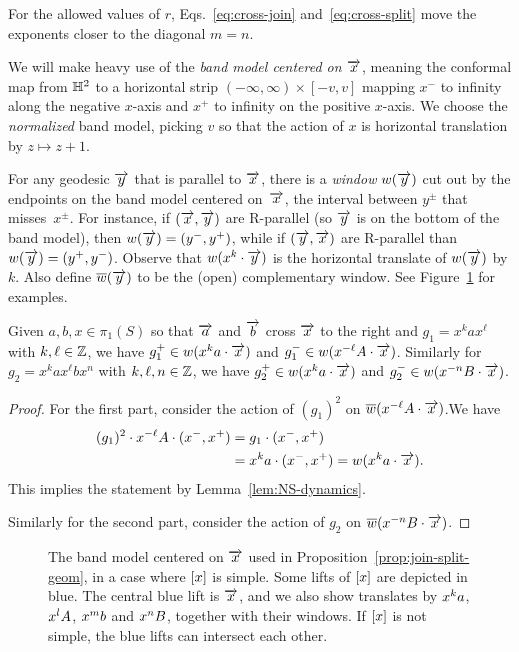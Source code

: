 For the allowed values of $r$, Eqs.\ \eqref{eq:cross-join}
and~\eqref{eq:cross-split} move the exponents closer to the
diagonal
$m=n$.

We will make heavy use of the \emph{band model centered on
$\overrightarrow{x}$}, meaning the conformal map from $\mathbb{H}^2$ to a horizontal
strip $(-\infty,\infty) \times [-v,v]$ mapping $x^-$ to infinity along
the negative $x$-axis and $x^+$ to infinity on the positive $x$-axis.
We choose the \emph{normalized} band model, picking $v$ so that the
action of $x$ is horizontal translation by $z \mapsto z+1$.

For any geodesic $\overrightarrow{y}$ that is parallel to
$\overrightarrow{x}$, there is a \emph{window} $w(\overrightarrow{y})$ cut out by the
endpoints on the band model centered on~$\overrightarrow{x}$, the interval between $y^\pm$ that
misses~$x^\pm$. For instance, if $(\overrightarrow{x},\overrightarrow{y})$ are R-parallel
(so $\overrightarrow{y}$ is on the bottom of the band model),
then $w(\overrightarrow{y}) = (y^-,y^+)$, while if $(\overrightarrow{y},\overrightarrow{x})$ are R-parallel than
$w(\overrightarrow{y}) = (y^+,y^-)$.
Observe that $w(x^k\cdot\overrightarrow{y})$ is the horizontal
translate of $w(\overrightarrow{y})$ by $k$.
Also define $\overline{w}(\overrightarrow{y})$ to be the (open)
complementary window.
See Figure~\ref{fig:abcrossings} for
examples.

\begin{lemma}
\label{lem:windows}
  Given $a,b, x \in \pi_1(S)$ so that $\overrightarrow{a}$ and $\overrightarrow{b}$ cross $\overrightarrow{x}$ to
  the right and $g_1 = x^k ax^\ell$ with $k,\ell \in \mathbb{Z}$, we have
  $g_1^+ \in w(x^k a\cdot\overrightarrow{x})$ and
  $g_1^- \in w(x^{-\ell}A\cdot\overrightarrow{x})$. Similarly for
  $g_2 = x^k a x^\ell b x^n$ with $k,\ell,n\in\mathbb{Z}$, we have
  $g_2^+ \in w(x^ka \cdot \overrightarrow{x})$ and $g_2^- \in w(x^{-n} B
  \cdot\overrightarrow{x})$.
\end{lemma}

\begin{proof}
  For the first part, consider the action of $(g_1)^2$ on
  $\overline{w}(x^{-\ell}A \cdot \overrightarrow{x})$.We have
  \begin{align*}
    (g_1)^2 \cdot x^{-\ell}A \cdot (x^-, x^+)
      &= g_1 \cdot (x^-,x^+)\\
      &= x^k a \cdot (x^-,x^+) = w(x^k a \cdot \overrightarrow{x}).
  \end{align*}
  This implies the statement by Lemma~\ref{lem:NS-dynamics}.

  Similarly for the second part, consider the action of $g_2$
  on $\overline{w}(x^{-n} B \cdot \overrightarrow{x})$.
\end{proof}

\begin{figure}
\caption{The band model centered on $\protect\overrightarrow{x}$ used in
  Proposition~\ref{prop:join-split-geom}, in a case where $\protect [x]$ is simple.
  Some lifts of $\protect [x]$ are depicted in blue. The central blue lift
  is $\protect\overrightarrow{x}$, and we also show translates by $ \protect x^k a$, $\protect x^l
  A$, $\protect x^m b$ and $\protect x^n B$, together with their windows.
  If $\protect[x]$ is not simple, the blue lifts can intersect each other.}\label{fig:abcrossings}
\end{figure}

